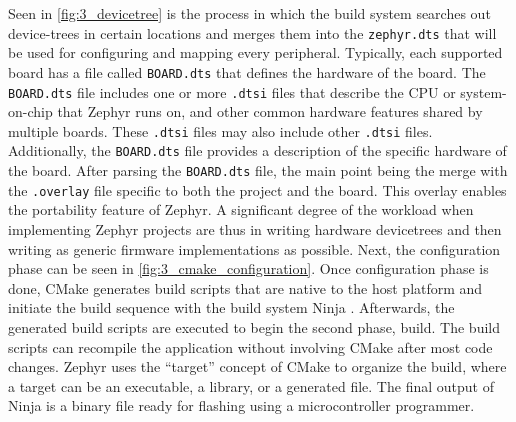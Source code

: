 Seen in \cref{fig:3_devicetree} is the process in which the build system searches out device-trees in certain locations and merges them into the \texttt{zephyr.dts} that will be used for configuring and mapping every peripheral. Typically, each supported board has a file called \texttt{BOARD.dts} that defines the hardware of the board. The \texttt{BOARD.dts} file includes one or more \texttt{.dtsi} files that describe the CPU or system-on-chip that Zephyr runs on, and other common hardware features shared by multiple boards. These \texttt{.dtsi} files may also include other \texttt{.dtsi} files. Additionally, the \texttt{BOARD.dts} file provides a description of the specific hardware of the board. After parsing the \texttt{BOARD.dts} file, the main point being the merge with the \texttt{.overlay} file specific to both the project and the board. This overlay enables the portability feature of Zephyr. A significant degree of the workload when implementing Zephyr projects are thus in writing hardware devicetrees and then writing as generic firmware implementations as possible. Next, the configuration phase can be seen in \cref{fig:3_cmake_configuration}. Once configuration phase is done, CMake generates build scripts that are native to the host platform and initiate the build sequence with the build system Ninja \cite{ninja}. Afterwards, the generated build scripts are executed to begin the second phase, build. The build scripts can recompile the application without involving CMake after most code changes. Zephyr uses the \enquote{target} concept of CMake to organize the build, where a target can be an executable, a library, or a generated file. The final output of Ninja is a binary file ready for \gls{flashing} using a microcontroller programmer.

